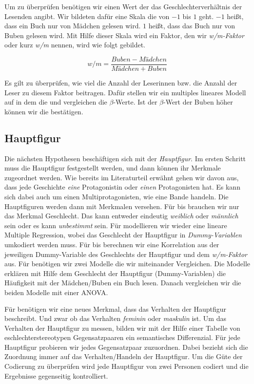 Um  zu überprüfen benötigen wir einen Wert der das
Geschlechterverhältnis der Lesenden angibt. Wir bildeten dafür eine
Skala die von $-1$ bis $1$ geht. $-1$ heißt, dass ein Buch nur von
Mädchen gelesen wird. $1$ heißt, dass das Buch nur von Buben gelesen
wird. Mit Hilfe dieser Skala wird ein Faktor, den wir \emph{w/m-Faktor}
oder kurz \emph{w/m} nennen, wird wie folgt gebildet.

\begin{equation}
    w/m=\frac{Buben-Mädchen}{Mädchen+Buben}
\end{equation}

Es gilt zu überprüfen, wie viel die Anzahl der Leserinnen bzw. die
Anzahl der Leser zu diesem Faktor beitragen. Dafür stellen wir ein
multiples lineares Modell auf in dem die und vergleichen die
$\beta$-Werte. Ist der $\beta$-Wert der Buben höher können wir die
 bestätigen.

\subsection{Hauptfigur}

Die nächsten Hypothesen beschäftigen sich mit der \emph{Hauptfigur}. Im
ersten Schritt muss die Hauptfigur festgestellt werden, und dann können
ihr Merkmale zugeordnet werden. Wie bereits im Literaturteil erwähnt
gehen wir davon aus, dass jede Geschichte \emph{eine} Protagonistin oder
\emph{einen} Protagonisten hat. Es kann sich dabei auch um einen
Multiprotagonisten, wie \zB eine Bande handeln. Die Hauptfiguren werden
dann mit Merkmalen versehen. Für  bis  brauchen
wir nur das Merkmal Geschlecht. Das kann entweder eindeutig
\emph{weiblich} oder \emph{männlich} sein oder es kann \emph{unbestimmt}
sein. Für  modellieren wir wieder eine lineare Multiple
Regression, wobei das Geschlecht der Hauptfigur in
\emph{Dummy-Variablen} umkodiert werden muss. Für  bis
 berechnen wir eine Korrelation aus der jeweiligen
Dummy-Variable des Geschlechts der Hauptfigur und dem \emph{w/m-Faktor}
aus. Für  benötigen wir zwei Modelle die wir miteinander
Vergleichen. Die Modelle erklären mit Hilfe dem Geschlecht der
Hauptfigur (Dummy-Variablen) die Häufigkeit mit der Mädchen/Buben ein
Buch lesen. Danach vergleichen wir die beiden Modelle mit einer ANOVA.

Für  benötigen wir eine neues Merkmal, dass das Verhalten der
Hauptfigur beschreibt. Und zwar ob das Verhalten \emph{feminin} oder
\emph{maskulin} ist. Um das Verhalten der Hauptfigur zu messen, bilden
wir mit der Hilfe einer Tabelle von eschlechterstereotypen
Gegensatzpaaren ein semantisches Differenzial.
\parencites[174\psq]{feldmann2006}[93\psqq]{Spillner1974} Für jede
Hauptfigur probieren wir jedes Gegensatzpaar zuzuordnen. Dabei bezieht
sich die Zuordnung immer auf das Verhalten/Handeln der Hauptfigur. Um
die Güte der Codierung zu überprüfen wird jede Hauptfigur von zwei
Personen codiert und die Ergebnisse gegenseitig kontrolliert.

